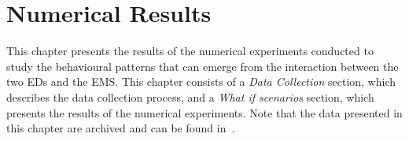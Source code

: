 \chapter{Numerical Results}\label{sec:numerical_results}

This chapter presents the results of the numerical experiments conducted to
study the behavioural patterns that can emerge from the interaction between the
two EDs and the EMS.
This chapter consists of a \textit{Data Collection} section, which describes the
data collection process, and a \textit{What if scenarios} section, which
presents the results of the numerical experiments.
Note that the data presented in this chapter are archived and can be found
in~\cite{michalis_panayides_2023_7555285}.






